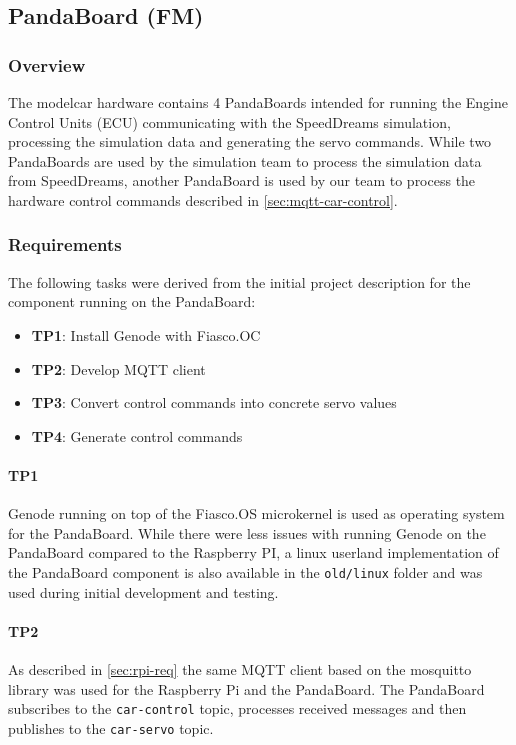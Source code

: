 \subsection{PandaBoard (FM)}
\label{sec:panda}

\subsubsection{Overview}
\label{sec:panda-overview}
The modelcar hardware contains 4 PandaBoards intended for running the Engine Control Units (ECU) communicating with the SpeedDreams simulation, processing the simulation data and generating the servo commands.
While two PandaBoards are used by the simulation team to process the simulation data from SpeedDreams, another Panda\-Board is used by our team to process the hardware control commands described in \autoref{sec:mqtt-car-control}.


\subsubsection{Requirements}
\label{sec:panda-req}
The following tasks were derived from the initial project description for the component running on the PandaBoard:
\begin{itemize}
    \item \textbf{TP1}: Install Genode with Fiasco.OC
    \item \textbf{TP2}: Develop MQTT client
    \item \textbf{TP3}: Convert control commands into concrete servo values
    \item \textbf{TP4}: Generate control commands
\end{itemize}

\paragraph{\textbf{TP1}} Genode running on top of the Fiasco.OS microkernel is used as operating system for the PandaBoard.
While there were less issues with running Genode on the PandaBoard compared to the Raspberry PI, a linux userland implementation of the PandaBoard component is also available in the \texttt{old/linux} folder and was used during initial development and testing.

\paragraph{\textbf{TP2}} As described in \autoref{sec:rpi-req} the same MQTT client based on the mosquitto library was used for the Raspberry Pi and the PandaBoard.
The PandaBoard subscribes to the \texttt{car-control} topic, processes received messages and then publishes to the \texttt{car-servo} topic.


